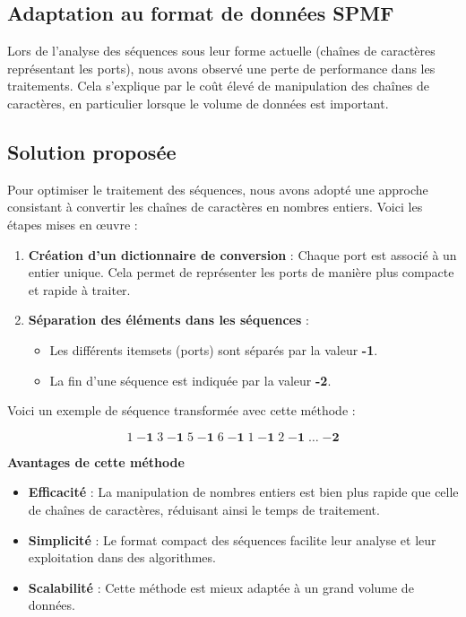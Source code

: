 \documentclass[a4paper,12pt]{article}
\begin{document}
\newpage
\subsection{ Adaptation au format de données SPMF}

Lors de l’analyse des séquences sous leur forme actuelle (chaînes de caractères représentant les ports), nous avons observé une perte de performance dans les traitements. Cela s’explique par le coût élevé de manipulation des chaînes de caractères, en particulier lorsque le volume de données est important.

\subsection{ Solution proposée}

Pour optimiser le traitement des séquences, nous avons adopté une approche consistant à convertir les chaînes de caractères en nombres entiers. Voici les étapes mises en œuvre :

\begin{enumerate}
    \item \textbf{Création d’un dictionnaire de conversion} : Chaque port est associé à un entier unique. Cela permet de représenter les ports de manière plus compacte et rapide à traiter.
    \item \textbf{Séparation des éléments dans les séquences} :
    \begin{itemize}
        \item Les différents itemsets (ports) sont séparés par la valeur \textbf{-1}.
        \item La fin d’une séquence est indiquée par la valeur \textbf{-2}.
    \end{itemize}
\end{enumerate}

Voici un exemple de séquence transformée avec cette méthode :

\[
1 \; \mathbf{-1} \; 3 \; \mathbf{-1} \;  5 \;\mathbf{-1} \;  6 \; \mathbf{-1} \; 1  \;\mathbf{-1} \; 2 \; \mathbf{-1} \; \ldots \; \mathbf{-2}
\]

\textbf{Avantages de cette méthode}

\begin{itemize}
    \item \textbf{Efficacité} : La manipulation de nombres entiers est bien plus rapide que celle de chaînes de caractères, réduisant ainsi le temps de traitement.
    \item \textbf{Simplicité} : Le format compact des séquences facilite leur analyse et leur exploitation dans des algorithmes.
    \item \textbf{Scalabilité} : Cette méthode est mieux adaptée à un grand volume de données.
\end{itemize}
\end{document}
